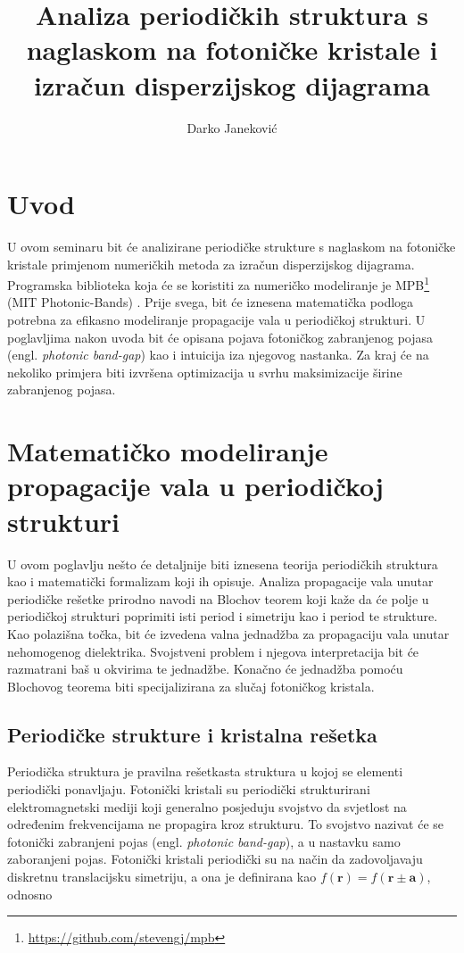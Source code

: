 \documentclass[utf8, seminar, numeric]{fer}
\begin{document}
\title{Analiza periodičkih struktura s naglaskom na fotoničke kristale
	   i izračun disperzijskog dijagrama}
\author{Darko Janeković}

\maketitle

\tableofcontents


\chapter{Uvod}
U ovom seminaru bit će analizirane periodičke strukture s naglaskom na fotoničke
kristale primjenom numeričkih metoda za izračun disperzijskog dijagrama.
Programska biblioteka koja će se koristiti za numeričko modeliranje je
MPB\footnote{\url{https://github.com/stevengj/mpb}} (MIT Photonic-Bands)
\cite{Johnson2001:mpb}. Prije svega, bit će iznesena
matematička podloga potrebna za efikasno modeliranje propagacije vala u
periodičkoj strukturi. U poglavljima nakon uvoda bit će opisana pojava fotoničkog
zabranjenog pojasa (engl. \textit{photonic band-gap}) kao i intuicija iza
njegovog nastanka. Za kraj će na nekoliko primjera biti izvršena optimizacija u
svrhu maksimizacije širine zabranjenog pojasa.


\chapter{Matematičko modeliranje propagacije vala u periodičkoj strukturi}

U ovom poglavlju nešto će detaljnije biti iznesena teorija periodičkih struktura
kao i matematički formalizam koji ih opisuje. Analiza propagacije vala unutar
periodičke rešetke prirodno navodi na Blochov teorem koji kaže da će polje u
periodičkoj strukturi poprimiti isti period i simetriju kao i period te strukture.
Kao polazišna točka, bit će izvedena valna jednadžba za propagaciju vala unutar
nehomogenog dielektrika. Svojstveni problem i njegova interpretacija bit će
razmatrani baš u okvirima te jednadžbe. Konačno će jednadžba pomoću Blochovog
teorema biti specijalizirana za slučaj fotoničkog kristala.


\section{Periodičke strukture i kristalna rešetka}

Periodička struktura je pravilna rešetkasta struktura u kojoj se elementi
periodički ponavljaju. Fotonički kristali su periodički strukturirani
elektromagnetski mediji koji generalno posjeduju svojstvo da svjetlost na
određenim frekvencijama ne propagira kroz strukturu. To svojstvo nazivat će se
fotonički zabranjeni pojas (engl. \textit{photonic band-gap}), a u nastavku
samo zaboranjeni pojas. Fotonički kristali periodički su na način da
zadovoljavaju diskretnu translacijsku simetriju, a ona je definirana kao
${f(\mathbf{r}) = f(\mathbf{r} \pm \mathbf{a})}$, odnosno
\end{document}
